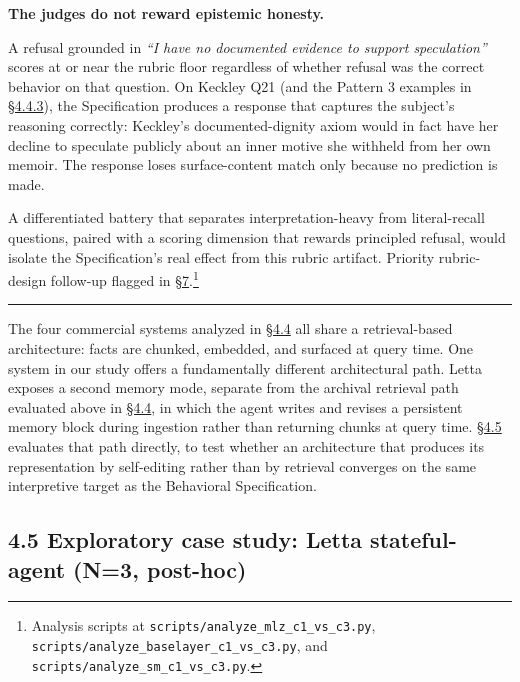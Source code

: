 \textbf{The judges do not reward epistemic honesty.}

A refusal grounded in \emph{``I have no documented evidence to support
speculation''} scores at or near the rubric floor regardless of whether
refusal was the correct behavior on that question. On Keckley Q21 (and
the Pattern 3 examples in \hyperref[where-the-spec-helps-where-it-hurts-and-which-question-types-route-to-each]{§4.4.3}), the Specification produces a response
that captures the subject's reasoning correctly: Keckley's
documented-dignity axiom would in fact have her decline to speculate
publicly about an inner motive she withheld from her own memoir. The
response loses surface-content match only because no prediction is made.

A differentiated battery that separates interpretation-heavy from
literal-recall questions, paired with a scoring dimension that rewards
principled refusal, would isolate the Specification's real effect from
this rubric artifact. Priority rubric-design follow-up flagged in
\hyperref[future-work]{§7}.\footnote{Analysis scripts at
  \texttt{scripts/analyze\_mlz\_c1\_vs\_c3.py},
  \texttt{scripts/analyze\_baselayer\_c1\_vs\_c3.py}, and
  \texttt{scripts/analyze\_sm\_c1\_vs\_c3.py}.}

\begin{center}\rule{0.5\linewidth}{0.5pt}\end{center}

The four commercial systems analyzed in \hyperref[memory-system-composition]{§4.4} all share a retrieval-based
architecture: facts are chunked, embedded, and surfaced at query time.
One system in our study offers a fundamentally different architectural
path. Letta exposes a second memory mode, separate from the archival
retrieval path evaluated above in \hyperref[memory-system-composition]{§4.4}, in which the agent writes and
revises a persistent memory block during ingestion rather than returning
chunks at query time. \hyperref[exploratory-case-study-letta-stateful-agent-n3-post-hoc]{§4.5} evaluates that path directly, to test whether
an architecture that produces its representation by self-editing rather
than by retrieval converges on the same interpretive target as the
Behavioral Specification.

\hypertarget{exploratory-case-study-letta-stateful-agent-n3-post-hoc}{%
\subsection{4.5 Exploratory case study: Letta stateful-agent (N=3,
post-hoc)}\label{exploratory-case-study-letta-stateful-agent-n3-post-hoc}}

